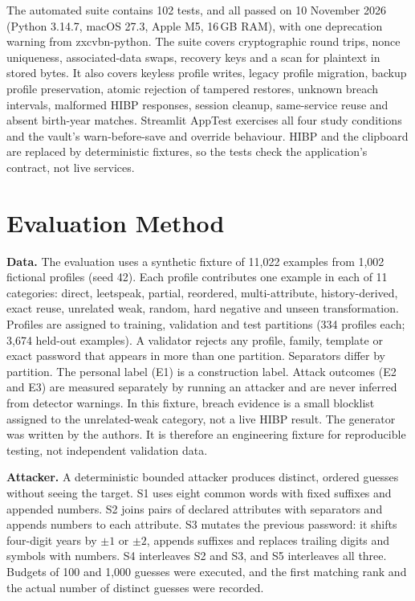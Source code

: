 \documentclass[conference]{IEEEtran}
\begin{document}
The automated suite contains 102 tests, and all passed on 10 November 2026 (Python 3.14.7, macOS 27.3, Apple M5, 16\,GB RAM), with one deprecation warning from zxcvbn-python. The suite covers cryptographic round trips, nonce uniqueness, associated-data swaps, recovery keys and a scan for plaintext in stored bytes. It also covers keyless profile writes, legacy profile migration, backup profile preservation, atomic rejection of tampered restores, unknown breach intervals, malformed HIBP responses, session cleanup, same-service reuse and absent birth-year matches. Streamlit AppTest exercises all four study conditions and the vault's warn-before-save and override behaviour. HIBP and the clipboard are replaced by deterministic fixtures, so the tests check the application's contract, not live services.

\section{Evaluation Method}
\textbf{Data.} The evaluation uses a synthetic fixture of 11,022 examples from 1,002 fictional profiles (seed 42). Each profile contributes one example in each of 11 categories: direct, leetspeak, partial, reordered, multi-attribute, history-derived, exact reuse, unrelated weak, random, hard negative and unseen transformation. Profiles are assigned to training, validation and test partitions (334 profiles each; 3,674 held-out examples). A validator rejects any profile, family, template or exact password that appears in more than one partition. Separators differ by partition. The personal label (E1) is a construction label. Attack outcomes (E2 and E3) are measured separately by running an attacker and are never inferred from detector warnings. In this fixture, breach evidence is a small blocklist assigned to the unrelated-weak category, not a live HIBP result. The generator was written by the authors. It is therefore an engineering fixture for reproducible testing, not independent validation data.

\textbf{Attacker.} A deterministic bounded attacker produces distinct, ordered guesses without seeing the target. S1 uses eight common words with fixed suffixes and appended numbers. S2 joins pairs of declared attributes with separators and appends numbers to each attribute. S3 mutates the previous password: it shifts four-digit years by $\pm 1$ or $\pm 2$, appends suffixes and replaces trailing digits and symbols with numbers. S4 interleaves S2 and S3, and S5 interleaves all three. Budgets of 100 and 1,000 guesses were executed, and the first matching rank and the actual number of distinct guesses were recorded.
\end{document}
